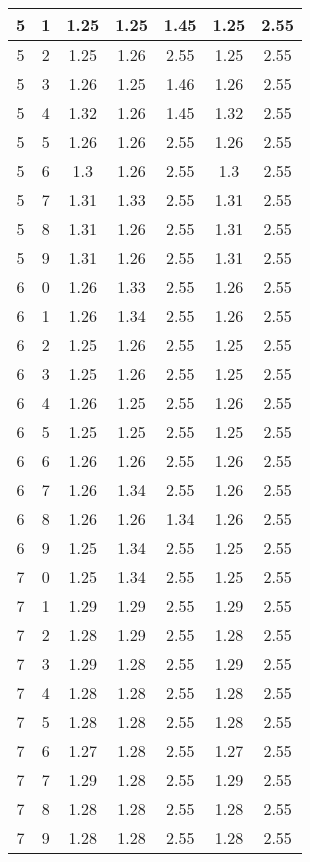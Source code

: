\begin{longtable}{|c|c||c||c|c||c|c|}
	5 & 1 & 1.25 & 1.25 & 1.45 & 1.25 & 2.55 \\ \hline
	5 & 2 & 1.25 & 1.26 & 2.55 & 1.25 & 2.55 \\ \hline
	5 & 3 & 1.26 & 1.25 & 1.46 & 1.26 & 2.55 \\ \hline
	5 & 4 & 1.32 & 1.26 & 1.45 & 1.32 & 2.55 \\ \hline
	5 & 5 & 1.26 & 1.26 & 2.55 & 1.26 & 2.55 \\ \hline
	5 & 6 & 1.3 & 1.26 & 2.55 & 1.3 & 2.55 \\ \hline
	5 & 7 & 1.31 & 1.33 & 2.55 & 1.31 & 2.55 \\ \hline
	5 & 8 & 1.31 & 1.26 & 2.55 & 1.31 & 2.55 \\ \hline
	5 & 9 & 1.31 & 1.26 & 2.55 & 1.31 & 2.55 \\ \hline
	6 & 0 & 1.26 & 1.33 & 2.55 & 1.26 & 2.55 \\ \hline
	6 & 1 & 1.26 & 1.34 & 2.55 & 1.26 & 2.55 \\ \hline
	6 & 2 & 1.25 & 1.26 & 2.55 & 1.25 & 2.55 \\ \hline
	6 & 3 & 1.25 & 1.26 & 2.55 & 1.25 & 2.55 \\ \hline
	6 & 4 & 1.26 & 1.25 & 2.55 & 1.26 & 2.55 \\ \hline
	6 & 5 & 1.25 & 1.25 & 2.55 & 1.25 & 2.55 \\ \hline
	6 & 6 & 1.26 & 1.26 & 2.55 & 1.26 & 2.55 \\ \hline
	6 & 7 & 1.26 & 1.34 & 2.55 & 1.26 & 2.55 \\ \hline
	6 & 8 & 1.26 & 1.26 & 1.34 & 1.26 & 2.55 \\ \hline
	6 & 9 & 1.25 & 1.34 & 2.55 & 1.25 & 2.55 \\ \hline
	7 & 0 & 1.25 & 1.34 & 2.55 & 1.25 & 2.55 \\ \hline
	7 & 1 & 1.29 & 1.29 & 2.55 & 1.29 & 2.55 \\ \hline
	7 & 2 & 1.28 & 1.29 & 2.55 & 1.28 & 2.55 \\ \hline
	7 & 3 & 1.29 & 1.28 & 2.55 & 1.29 & 2.55 \\ \hline
	7 & 4 & 1.28 & 1.28 & 2.55 & 1.28 & 2.55 \\ \hline
	7 & 5 & 1.28 & 1.28 & 2.55 & 1.28 & 2.55 \\ \hline
	7 & 6 & 1.27 & 1.28 & 2.55 & 1.27 & 2.55 \\ \hline
	7 & 7 & 1.29 & 1.28 & 2.55 & 1.29 & 2.55 \\ \hline
	7 & 8 & 1.28 & 1.28 & 2.55 & 1.28 & 2.55 \\ \hline
	7 & 9 & 1.28 & 1.28 & 2.55 & 1.28 & 2.55 \\ \hline
\end{longtable}
